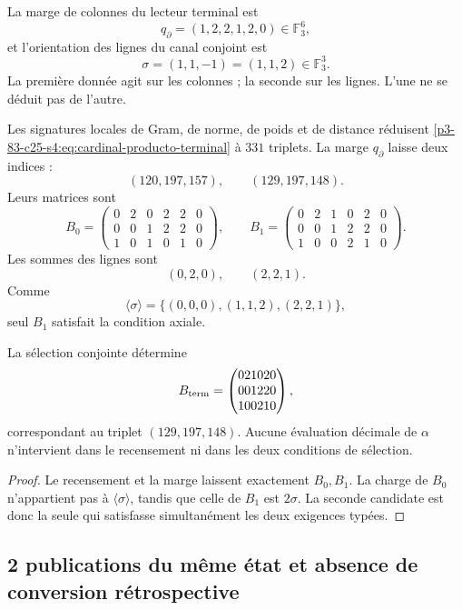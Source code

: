 La marge de colonnes du lecteur terminal est
\[
 q_\partial=(1,2,2,1,2,0)\in\mathbb F_3^6,
\]
et l’orientation des lignes du canal conjoint est
\[
 \sigma=(1,1,-1)=(1,1,2)\in\mathbb F_3^3.
\]
La première donnée agit sur les colonnes ; la seconde sur les lignes. L’une ne se déduit pas
de l’autre.

Les signatures locales de Gram, de norme, de poids et de distance réduisent
\eqref{p3-83-c25-s4:eq:cardinal-producto-terminal} à \(331\) triplets. La marge
\(q_\partial\) laisse deux indices :
\[
 (120,197,157),
 \qquad
 (129,197,148).
\]
Leurs matrices sont
\[
 B_0=
 \begin{pmatrix}
 0&2&0&2&2&0\\
 0&0&1&2&2&0\\
 1&0&1&0&1&0
 \end{pmatrix},
 \qquad
 B_1=
 \begin{pmatrix}
 0&2&1&0&2&0\\
 0&0&1&2&2&0\\
 1&0&0&2&1&0
 \end{pmatrix}.
\]
Les sommes des lignes sont
\[
 (0,2,0),
 \qquad
 (2,2,1).
\]
Comme
\[
 \langle\sigma\rangle
 =\{(0,0,0),(1,1,2),(2,2,1)\},
\]
seul \(B_1\) satisfait la condition axiale.

\begin{theorem}
\label{p3-83-c25-s4:thm:unicidad-publicacion-terminal-visible}
La sélection conjointe détermine
\begin{equation}
 B_{\rm term}=
 \begin{pmatrix}
 021020\\001220\\100210
 \end{pmatrix},
 \label{p3-83-c25-s4:eq:matriz-terminal-visible}
\end{equation}
correspondant au triplet \((129,197,148)\). Aucune évaluation décimale de
\(\alpha\) n’intervient dans le recensement ni dans les deux conditions de sélection.
\end{theorem}

\begin{proof}
Le recensement et la marge laissent exactement \(B_0,B_1\). La charge de \(B_0\)
n’appartient pas à \(\langle\sigma\rangle\), tandis que celle de \(B_1\) est
\(2\sigma\). La seconde candidate est donc la seule qui satisfasse
simultanément les deux exigences typées.
\end{proof}

\subsection{2 publications du même état et absence de conversion rétrospective}

